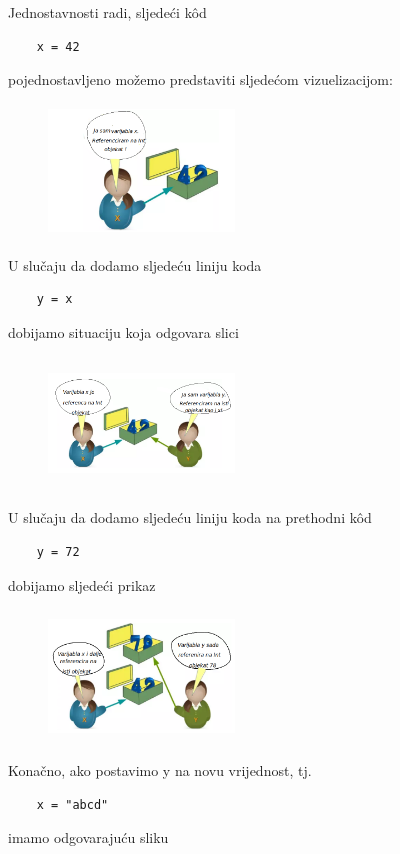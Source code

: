 Jednostavnosti radi, sljedeći k\^od
\begin{verbatim}
    x = 42
\end{verbatim}
 pojednostavljeno možemo predstaviti sljedećom vizuelizacijom:
\begin{figure}[H]
	\centering
   \includegraphics[width=140pt,height=100pt]{slike/variable_object.png}
\end{figure}
U slučaju da dodamo sljedeću liniju   koda 
\begin{verbatim}
	y = x
\end{verbatim}
dobijamo situaciju    koja odgovara slici

\begin{figure}[H]
	\centering
	\includegraphics[width=140pt,height=100pt]{slike/point_two_vars.png}
\end{figure}
U slučaju da dodamo sljedeću liniju koda na prethodni k\^od
\begin{verbatim}
	y = 72
\end{verbatim}
dobijamo sljedeći prikaz
\begin{figure}[H]
	\centering
	\includegraphics[width=140pt,height=100pt]{slike/vars_different_assigned.png}
\end{figure}
Konačno, ako postavimo y na novu vrijednost, tj.
\begin{verbatim}
	x = "abcd" 
\end{verbatim}
imamo odgovarajuću sliku 

